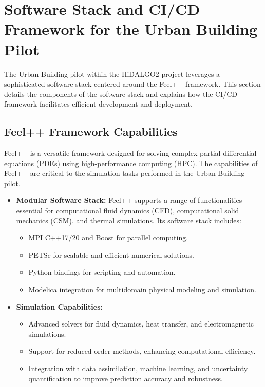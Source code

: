 \documentclass[runningheads]{llncs}
\begin{document}
\section{Software Stack and CI/CD Framework for the Urban Building Pilot}
The Urban Building pilot within the HiDALGO2 project leverages a sophisticated software stack centered around the Feel++ framework. This section details the components of the software stack and explains how the CI/CD framework facilitates efficient development and deployment.

\subsection{Feel++ Framework Capabilities}
Feel++ is a versatile framework designed for solving complex partial differential equations (PDEs) using high-performance computing (HPC). The capabilities of Feel++ are critical to the simulation tasks performed in the Urban Building pilot.

\begin{itemize}
    \item \textbf{Modular Software Stack:} Feel++ supports a range of functionalities essential for computational fluid dynamics (CFD), computational solid mechanics (CSM), and thermal simulations. Its software stack includes:
    \begin{itemize}
        \item MPI C++17/20 and Boost for parallel computing.
        \item PETSc for scalable and efficient numerical solutions.
        \item Python bindings for scripting and automation.
        \item Modelica integration for multidomain physical modeling and simulation.
    \end{itemize}

    \item \textbf{Simulation Capabilities:}
    \begin{itemize}
        \item Advanced solvers for fluid dynamics, heat transfer, and electromagnetic simulations.
        \item Support for reduced order methods, enhancing computational efficiency.
        \item Integration with data assimilation, machine learning, and uncertainty quantification to improve prediction accuracy and robustness.
    \end{itemize}
\end{itemize}
\end{document}
